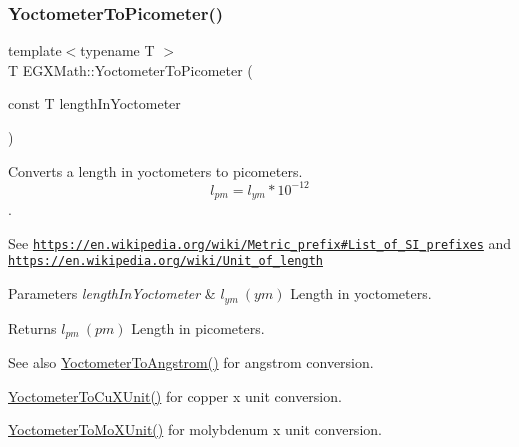 \subsubsection{\texorpdfstring{Yoctometer\+To\+Picometer()}{YoctometerToPicometer()}}
{\footnotesize\ttfamily template$<$typename T $>$ \\
T E\+G\+X\+Math\+::\+Yoctometer\+To\+Picometer (\begin{DoxyParamCaption}\item[{const T}]{length\+In\+Yoctometer }\end{DoxyParamCaption})}



Converts a length in yoctometers to picometers. \[ l_{pm}=l_{ym} * 10^{-12} \]. 

See \href{https://en.wikipedia.org/wiki/Metric_prefix#List_of_SI_prefixes}{\tt https\+://en.\+wikipedia.\+org/wiki/\+Metric\+\_\+prefix\#\+List\+\_\+of\+\_\+\+S\+I\+\_\+prefixes} and \href{https://en.wikipedia.org/wiki/Unit_of_length}{\tt https\+://en.\+wikipedia.\+org/wiki/\+Unit\+\_\+of\+\_\+length} 
\begin{DoxyParams}{Parameters}
{\em length\+In\+Yoctometer} & $ l_{ym}\ (ym)$ Length in yoctometers. \\
\hline
\end{DoxyParams}
\begin{DoxyReturn}{Returns}
$ l_{pm}\ (pm)$ Length in picometers. 
\end{DoxyReturn}
\begin{DoxySeeAlso}{See also}
\mbox{\hyperlink{group___e_g_x_math-_conversions-_length_conversions-_yoctometer-_non-_s_i_ga1189896c419175e90e23cea9d8f6b52a}{Yoctometer\+To\+Angstrom()}} for angstrom conversion. 

\mbox{\hyperlink{group___e_g_x_math-_conversions-_length_conversions-_yoctometer-_non-_s_i_ga0266faf325ea86fef13391fb6e792ff8}{Yoctometer\+To\+Cu\+X\+Unit()}} for copper x unit conversion. 

\mbox{\hyperlink{group___e_g_x_math-_conversions-_length_conversions-_yoctometer-_non-_s_i_ga6a6a1fb3ecc97e377fc728c03327048e}{Yoctometer\+To\+Mo\+X\+Unit()}} for molybdenum x unit conversion. 
\end{DoxySeeAlso}
\mbox{\label{group___e_g_x_math-_conversions-_length_conversions-_yoctometer-_s_i_gae5313d3fbe14e0cbb4b58d4d432857e1}} 
